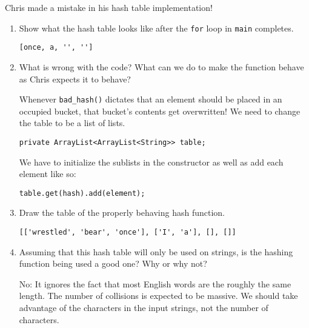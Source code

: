 %
%


Chris made a mistake in his hash table implementation!

    

    \begin{enumerate}
    \item Show what the hash table looks like after the \texttt{for} loop in \texttt{main}
          completes.

        \begin{answer}
		\begin{lstlisting}[numbers=none]
[once, a, '', '']
		\end{lstlisting}
        \end{answer}

    \item What is wrong with the code? What can we do to make the function behave as Chris expects it to behave?

        \begin{answer}
        Whenever \texttt{bad\_hash()} dictates that an element should be placed in an occupied bucket, that bucket's contents get overwritten! 
	We need to change the table to be a list of lists.
\begin{lstlisting}[numbers=none]
private ArrayList<ArrayList<String>> table;
\end{lstlisting}
	We have to initialize the sublists in the constructor as well as add each element like so:
\begin{lstlisting}[numbers=none]
table.get(hash).add(element);
\end{lstlisting}

        \end{answer}

    \item Draw the table of the properly behaving hash function.

        \begin{answer}
		\begin{lstlisting}[numbers=none]
[['wrestled', 'bear', 'once'], ['I', 'a'], [], []]
		\end{lstlisting}
    \end{answer}
\item Assuming that this hash table will only be used on strings, is the hashing function being used a good one? Why or why not?

    \begin{answer}
        No: It ignores the fact that most English words are the roughly the same length. The number of collisions is expected to be massive. We should take advantage of the characters in the input strings, not the number of characters.
    \end{answer}
    \end{enumerate}
